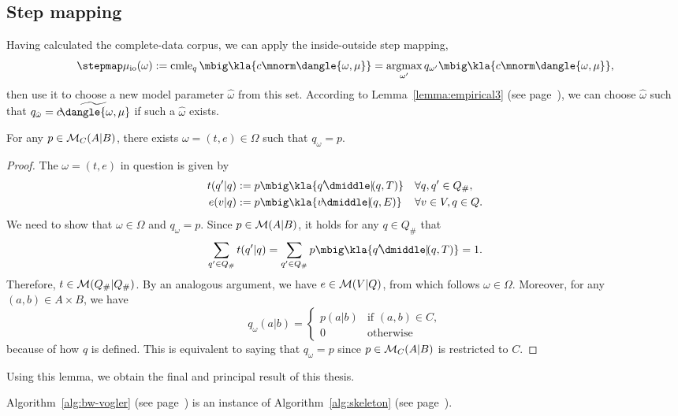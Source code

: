 \subsection{Step mapping}

Having calculated the complete-data corpus, we can apply the inside-outside
step mapping,
\[
 \stepmap\mu_\mathrm{io}(\omega) := \cmle_q\mbig\kla{c\mnorm\dangle{\omega,\mu}} = \argmax_{\omega'} q_{\omega'}\mbig\kla{c\mnorm\dangle{\omega,\mu}},
\]
then use it to choose a new model parameter $\hat\omega$ from this set.
According to Lemma~\ref{lemma:empirical3} (see
page~\pageref{lemma:empirical3}), we can choose $\hat\omega$ such that
$q_{\hat\omega} = \widetilde{c\!\dangle{\omega,\mu}}$ if such a
$\hat\omega$ exists.

\begin{lemma}
 For any $p\in\mathcal M_C(A|B)$, there exists $\omega=(t,e)\in\Omega$ such that $q_\omega = p$.
\end{lemma}

\begin{proof}
 The $\omega=(t,e)$ in question is given by
 \begin{align*}
  t(q'|q) &:= p\mbig\kla{q'\npipe(q,T)} &&\forall q,q'\in Q_\#, \\
  e(v|q) &:= p\mbig\kla{v\npipe(q,E)} &&\forall v\in V,q\in Q.
 \end{align*}
 We need to show that $\omega\in\Omega$ and $q_\omega=p$. Since $p\in\mathcal M(A|B)$,
 it holds for any $q\in Q_\#$ that
 \[
  \sum_{q'\in Q_\#} t(q'|q) = \sum_{q'\in Q_\#} p\mbig\kla{q'\npipe(q,T)} = 1.
 \]
 Therefore, $t\in\mathcal M(Q_\#|Q_\#)$. By an analogous argument, we have
 $e\in\mathcal M(V|Q)$, from which follows $\omega\in\Omega$. Moreover, for any
 $(a,b)\in A\times B$, we have
 \[
  q_\omega(a|b) = \begin{cases}
   p(a|b) & \text{if } (a,b)\in C, \\
   0 & \text{otherwise}
  \end{cases}
 \]
 because of how $q$ is defined. This is equivalent to saying that $q_\omega=p$
 since $p\in\mathcal M_C(A|B)$ is restricted to $C$.
\end{proof}

Using this lemma, we obtain the final and principal result of this thesis.

\begin{theorem}
 Algorithm~\ref{alg:bw-vogler} (see page~\pageref{alg:bw-vogler}) is an
 instance of Algorithm~\ref{alg:skeleton} (see page~\pageref{alg:skeleton}).
\end{theorem}

